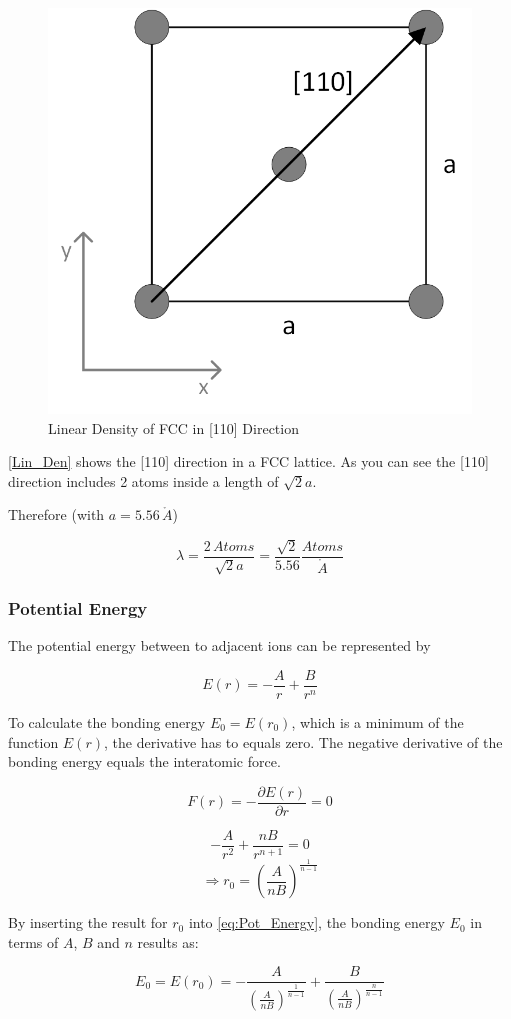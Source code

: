 \begin{figure}[H]
	\centering
	\includegraphics[width=0.5\linewidth]{Graphics/Chapter1/Lin_Den}
	\caption{Linear Density of FCC in [110] Direction}
	\label{Lin_Den}
\end{figure}

\autoref{Lin_Den} shows the [110] direction in a FCC lattice.
As you can see the [110] direction includes 2 atoms inside a 
length of $\sqrt{2}a$.

Therefore  (with $a = 5.56 \, \mathring{A}$)

$$\lambda = \frac{2 \, Atoms}{\sqrt{2}a} = \frac{\sqrt{2}}{5.56} \frac{Atoms}{\mathring{A}}$$

\subsubsection*{Potential Energy}

The potential energy between to adjacent ions can be represented by

\begin{equation}
	E(r) = - \frac{A}{r} + \frac{B}{r^n}
	\label{eq:Pot_Energy}
\end{equation}


To calculate the bonding energy $E_0 = E(r_0)$, which is a minimum of the function $E(r)$,
the derivative has to equals zero.
The negative derivative of the bonding energy equals the interatomic force.

$$F(r) = - \frac{\partial E(r)}{\partial r} = 0$$

$$-\frac{A}{r^2} + \frac{nB}{r^{n+1}} = 0$$
$$\Rightarrow r_0 = \left( \frac{A}{nB} \right)^{\frac{1}{n-1}}$$

By inserting the result for $r_0$ into \autoref{eq:Pot_Energy}, the bonding energy $E_0$ in terms of $A$, $B$ and $n$ results as:

$$E_0 = E(r_0) = - \frac{A}{\left( \frac{A}{nB} \right)^{\frac{1}{n-1}}} + 
				\frac{B}{\left( \frac{A}{nB} \right)^{\frac{n}{n-1}}}$$

